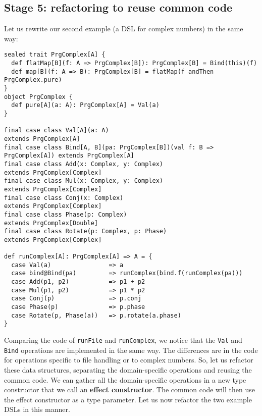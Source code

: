 \subsection{Stage 5: refactoring to reuse common code}

Let us rewrite our second example (a DSL for complex numbers) in the
same way:
\begin{lstlisting}
sealed trait PrgComplex[A] {
  def flatMap[B](f: A => PrgComplex[B]): PrgComplex[B] = Bind(this)(f)
  def map[B](f: A => B): PrgComplex[B] = flatMap(f andThen PrgComplex.pure)
}
object PrgComplex {
  def pure[A](a: A): PrgComplex[A] = Val(a)
}

final case class Val[A](a: A)                                             extends PrgComplex[A]
final case class Bind[A, B](pa: PrgComplex[B])(val f: B => PrgComplex[A]) extends PrgComplex[A]
final case class Add(x: Complex, y: Complex)                              extends PrgComplex[Complex]
final case class Mul(x: Complex, y: Complex)                              extends PrgComplex[Complex]
final case class Conj(x: Complex)                                         extends PrgComplex[Complex]
final case class Phase(p: Complex)                                        extends PrgComplex[Double]
final case class Rotate(p: Complex, p: Phase)                             extends PrgComplex[Complex]

def runComplex[A]: PrgComplex[A] => A = {
  case Val(a)                => a
  case bind@Bind(pa)         => runComplex(bind.f(runComplex(pa)))
  case Add(p1, p2)           => p1 + p2
  case Mul(p1, p2)           => p1 * p2
  case Conj(p)               => p.conj
  case Phase(p)              => p.phase
  case Rotate(p, Phase(a))   => p.rotate(a.phase)
}
\end{lstlisting}
Comparing the code of \lstinline!runFile!
and \lstinline!runComplex!,
we notice that the \lstinline!Val!
and \lstinline!Bind! operations
are implemented in the same way. The differences are in the code for
operations specific to file handling or to complex numbers. So, let
us refactor these data structures, separating the domain-specific
operations and reusing the common code. We can gather all the domain-specific
operations in a new type constructor that we call an \textbf{effect
constructor}. The common code will then use the effect constructor
as a type parameter. Let us now refactor the two example DSLs in this
manner.

